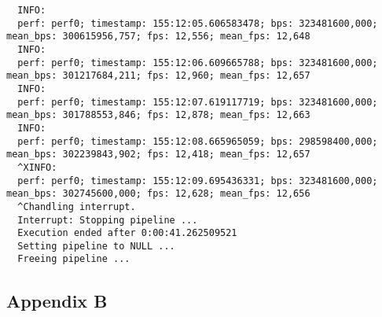 \documentclass[12pt,oneside]{book}
\begin{document}
\begin{lstlisting}
  INFO:
  perf: perf0; timestamp: 155:12:05.606583478; bps: 323481600,000; mean_bps: 300615956,757; fps: 12,556; mean_fps: 12,648
  INFO:
  perf: perf0; timestamp: 155:12:06.609665788; bps: 323481600,000; mean_bps: 301217684,211; fps: 12,960; mean_fps: 12,657
  INFO:
  perf: perf0; timestamp: 155:12:07.619117719; bps: 323481600,000; mean_bps: 301788553,846; fps: 12,878; mean_fps: 12,663
  INFO:
  perf: perf0; timestamp: 155:12:08.665965059; bps: 298598400,000; mean_bps: 302239843,902; fps: 12,418; mean_fps: 12,657
  ^XINFO:
  perf: perf0; timestamp: 155:12:09.695436331; bps: 323481600,000; mean_bps: 302745600,000; fps: 12,628; mean_fps: 12,656
  ^Chandling interrupt.
  Interrupt: Stopping pipeline ...
  Execution ended after 0:00:41.262509521
  Setting pipeline to NULL ...
  Freeing pipeline ...  
\end{lstlisting}

\subsection*{Appendix B}
\end{document}
